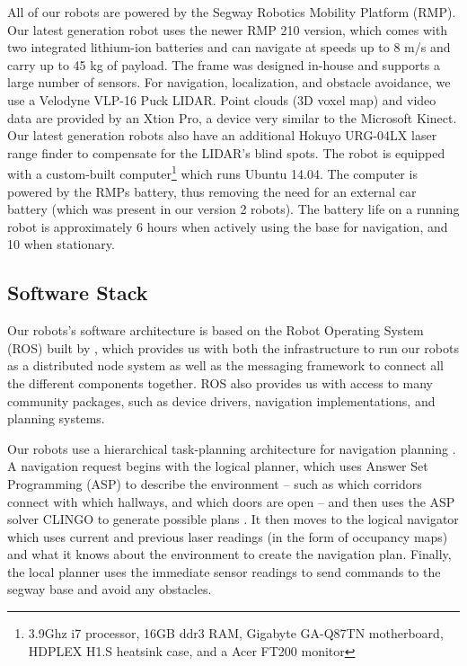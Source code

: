 \documentclass[
  oneside,
  11pt, a4paper,
  footinclude=true,
  headinclude=true,
  cleardoublepage=empty
]{article}
\begin{document}
All of our robots are powered by the Segway Robotics Mobility Platform (RMP).
Our latest generation robot uses the newer RMP 210 version, which comes with two
integrated lithium-ion batteries and can navigate at speeds up to 8
m/s and carry up to 45 kg of payload. The frame was designed in-house
and supports a large number of sensors. For navigation, localization, and
obstacle avoidance, we use a Velodyne VLP-16 Puck LIDAR. Point clouds (3D voxel
map) and video data are provided by an Xtion Pro, a device very similar to the
Microsoft Kinect. Our latest generation robots also have an additional Hokuyo
URG-04LX laser range finder to compensate for the LIDAR's blind spots. The
robot is equipped with a custom-built computer\footnote{3.9Ghz i7 processor,
16GB ddr3 RAM, Gigabyte GA-Q87TN motherboard, HDPLEX H1.S heatsink case, and a
Acer FT200 monitor} which runs Ubuntu 14.04. The computer is powered by the
RMPs battery, thus removing the need for an external car battery (which was
present in our version 2 robots).  The battery life on a running robot is
approximately 6 hours when actively using the base for navigation, and 10 when
stationary.

\subsection{Software Stack}

Our robots's software architecture is based on the Robot Operating System (ROS)
built by \citet{quigley2009}, which provides us with both the infrastructure to
run our robots as a distributed node system as well as the messaging framework
to connect all the different components together. ROS also provides us with
access to many community packages, such as device drivers, navigation
implementations, and planning systems.

Our robots use a hierarchical task-planning architecture for navigation
planning \citep{zhang2014}. A navigation request begins with the logical
planner, which uses Answer Set Programming (ASP) to describe the environment
\citep{lifschitz2008} -- such as which corridors connect with which hallways,
and which doors are open -- and then uses the ASP solver CLINGO to generate
possible plans \citep{gebser2014clingo}. It then moves to the logical navigator
which uses current and previous laser readings (in the form of occupancy maps)
and what it knows about the environment to create the navigation plan. Finally,
the local planner uses the immediate sensor readings to send commands to the
segway base and avoid any obstacles.
\end{document}

